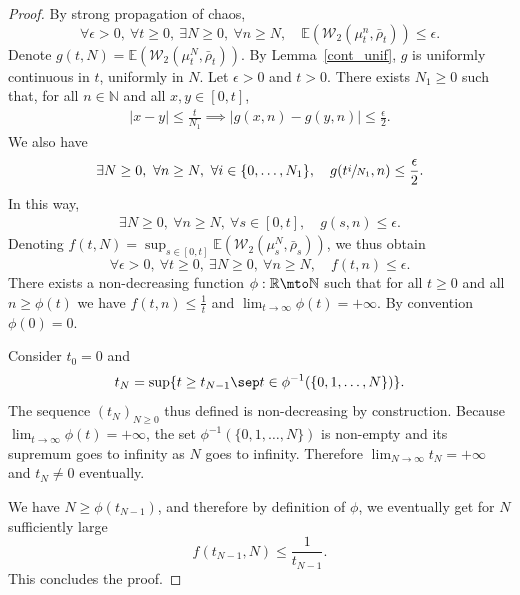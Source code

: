 \begin{proof}
By strong propagation of chaos,
\begin{equation}\label{Conv_non_unif_base}
\forall \epsilon>0,\ \forall t\geq0,\ \exists N\geq0,\ \forall n\geq N,\quad \mathbb{E}\left(\mathcal{W}_2\left(\mu^n_{t},\bar{\rho}_{t}\right)\right)\leq \epsilon.
\end{equation}
Denote $g(t,N)=\mathbb{E}\left(\mathcal{W}_2\left(\mu^N_{t},\bar{\rho}_{t}\right)\right)$. By Lemma~\ref{cont_unif}, $g$ is uniformly continuous in $t$, uniformly in $N$. Let $\epsilon>0$ and $t>0$. There exists $N_1\geq0$ such that, for all $n\in\mathbb{N}$ and all $x,y\in[0,t]$,
\begin{align*}
|x-y|\leq\frac{t}{N_1}\implies |g(x,n)-g(y,n)|\leq\frac{\epsilon}{2}.
\end{align*}
We also have\vspace*{-3pt}
\[
\exists N\geq0,\ \forall n\geq N,\ \forall i\in \{0,\dots,N_1\},\quad g(t\sfrac{i}{N_1},n)\leq \frac{\epsilon}{2}.
\]
In this way,\vspace*{-3pt}
\begin{align*}
\exists N\geq0,\ \forall n\geq N,\ \forall s\in [0,t],\quad g(s,n)\leq \epsilon.
\end{align*}
Denoting $f(t,N)=\sup_{s\in[0,t]}\mathbb{E}\left(\mathcal{W}_2\left(\mu^N_{s},\bar{\rho}_{s}\right)\right)$, we thus obtain
\begin{equation}\label{Conv_non_unif_sup}
\forall \epsilon>0,\ \forall t\geq0,\ \exists N\geq0,\ \forall n\geq N,\quad f(t,n)\leq \epsilon.
\end{equation}
There exists a non-decreasing function $\phi:\mathbb{R}\mto \mathbb{N}$ such that for all $t\geq0$ and all $n\geq \phi(t)$ we have $f(t,n)\leq\frac{1}{t}$ and $\lim_{t\to\infty}\phi(t)=+\infty$. By convention $\phi(0)=0$.

Consider $t_0=0$ and\vspace*{-3pt}
\[ t_N=\sup\{t\geq t_{N-1}\sep t\in\phi^{-1}(\{0,1,\dots,N\})\}.
\]
The sequence $(t_N)_{N\geq0}$ thus defined is non-decreasing by construction. Because $\lim_{t\to\infty}\phi(t)=+\infty$, the set $\phi^{-1}(\{0,1,\dots,N\})$ is non-empty and its supremum goes to infinity as $N$ goes to infinity. Therefore $\lim_{N\to\infty}t_N=+\infty$ and $t_N\neq0$ eventually.

We have $N\geq\phi(t_{N-1})$, and therefore by definition of $\phi$, we eventually get for $N$ sufficiently large\vspace*{-3pt}
\[
f(t_{N-1},N)\leq\frac{1}{t_{N-1}}.
\]
This concludes the proof.
\end{proof}

